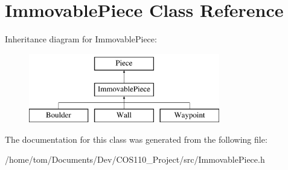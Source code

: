 \hypertarget{classImmovablePiece}{\section{Immovable\-Piece Class Reference}
\label{classImmovablePiece}
}
Inheritance diagram for Immovable\-Piece\-:\begin{figure}[H]
\begin{center}
\leavevmode
\includegraphics[height=3.000000cm]{classImmovablePiece}
\end{center}
\end{figure}


The documentation for this class was generated from the following file\-:\begin{DoxyCompactItemize}
\item 
/home/tom/\-Documents/\-Dev/\-C\-O\-S110\-\_\-\-Project/src/Immovable\-Piece.\-h\end{DoxyCompactItemize}
